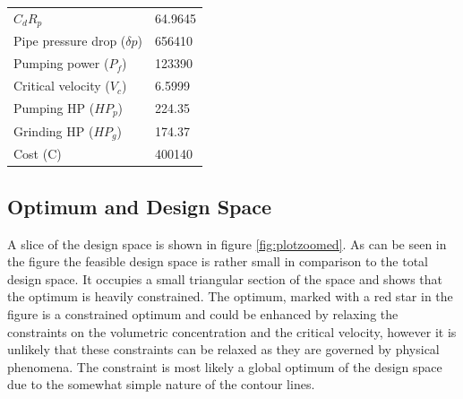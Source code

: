 \documentclass{article}
\begin{document}
\begin{center}
\begin{tabular}{|l|l|}
	$C_dR_p$                                 & 64.9645                   \\
	Pipe pressure drop ($\delta p$)          & 656410                    \\
	Pumping power ($P_f$)                    & 123390                    \\
	Critical velocity ($V_c$)                & 6.5999                    \\
	Pumping HP ($HP_p$)						 & 224.35					 \\
	Grinding HP ($HP_g$)					 & 174.37					 \\
	Cost (C)                                 & 400140                    \\
	\hline
\end{tabular}
\end{center}
\subsection{Optimum and Design Space}
A slice of the design space is shown in figure \ref{fig:plotzoomed}.  As can be seen in the figure the feasible design space is rather small in comparison to the total design space. It occupies a small triangular section of the space and shows that the optimum is heavily constrained. The optimum, marked with a red star in the figure is a constrained optimum and could be enhanced by relaxing the constraints on the volumetric concentration and the critical velocity, however it is unlikely that these constraints can be relaxed as they are governed by physical phenomena.  The constraint is most likely a global optimum of the design space due to the somewhat simple nature of the contour lines.
\end{document}
